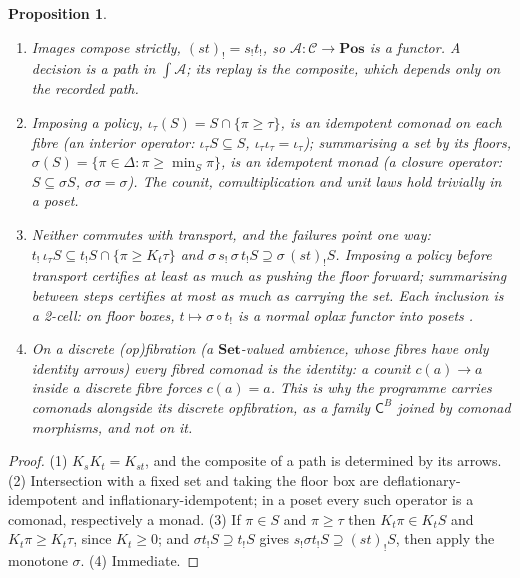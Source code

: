 \documentclass[11pt]{article}
\newtheorem{proposition}[theorem]{Proposition}
\theoremstyle{definition}
\theoremstyle{remark}
\begin{document}
\begin{proposition}\label{prop:fibred}
\begin{enumerate}[leftmargin=*,nosep]
\item Images compose strictly, $(st)_!=s_!t_!$, so $\mathcal A:\mathcal C\to\mathbf{Pos}$ is a functor. A decision is a path in
  $\int\!\mathcal A$; its replay is the composite, which depends only on the recorded path.
\item Imposing a policy, $\iota_\tau(S)=S\cap\{\pi\ge\tau\}$, is an idempotent comonad on each fibre (an interior operator:
  $\iota_\tau S\subseteq S$, $\iota_\tau\iota_\tau=\iota_\tau$); summarising a set by its floors,
  $\sigma(S)=\{\pi\in\Delta:\pi\ge\min_S\pi\}$, is an idempotent monad (a closure operator: $S\subseteq\sigma S$, $\sigma\sigma=\sigma$).
  The counit, comultiplication and unit laws hold trivially in a poset.
\item Neither commutes with transport, and the failures point one way:
  $t_!\,\iota_\tau S\subseteq t_!S\cap\{\pi\ge K_t\tau\}$ and $\sigma\, s_!\,\sigma\, t_!S\supseteq\sigma\,(st)_!S$. Imposing a policy
  before transport certifies at least as much as pushing the floor forward; summarising between steps certifies at most as much
  as carrying the set. Each inclusion is a 2-cell: on floor boxes, $t\mapsto\sigma\circ t_!$ is a normal oplax functor into posets
  \cite[Prop.~10.24]{Tower}.
\item On a discrete (op)fibration (a $\mathbf{Set}$-valued ambience, whose fibres have only identity arrows) every fibred comonad is
  the identity: a counit $c(a)\to a$ inside a discrete fibre forces $c(a)=a$. This is why the programme carries comonads
  \emph{alongside} its discrete opfibration, as a family $\mathsf C^B$ joined by comonad morphisms, and not \emph{on} it.
\end{enumerate}
\end{proposition}
\begin{proof}(1) $K_sK_t=K_{st}$, and the composite of a path is determined by its arrows. (2) Intersection with a fixed set and
taking the floor box are deflationary-idempotent and inflationary-idempotent; in a poset every such operator is a comonad,
respectively a monad. (3) If $\pi\in S$ and $\pi\ge\tau$ then $K_t\pi\in K_tS$ and $K_t\pi\ge K_t\tau$, since $K_t\ge0$; and
$\sigma t_!S\supseteq t_!S$ gives $s_!\sigma t_!S\supseteq(st)_!S$, then apply the monotone $\sigma$. (4) Immediate.\end{proof}
\end{document}
